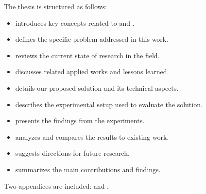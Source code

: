 The thesis is structured as follows:

\begin{itemize}
    \item {} introduces key concepts related to  and .
    \item {} defines the specific problem addressed in this work.
    \item {} reviews the current state of research in the field.
    \item {} discusses related applied works and lessons learned.
    \item {} details our proposed solution and its technical aspects.
    \item {} describes the experimental setup used to evaluate the solution.
    \item {} presents the findings from the experiments.
    \item {} analyzes and compares the results to existing work.
    \item {} suggests directions for future research.
    \item {} summarizes the main contributions and findings.
\end{itemize}

Two appendices are included:  and .